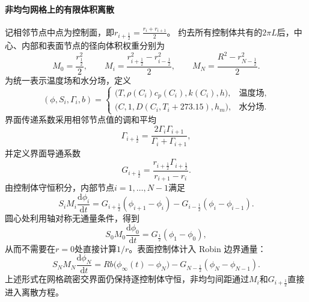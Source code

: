 \documentclass[withoutpreface,bwprint]{cumcmthesis}
\begin{document}
\paragraph{非均匀网格上的有限体积离散}
记相邻节点中点为控制面，即$r_{i+\frac12}=\frac{r_i+r_{i+1}}{2}$。
约去所有控制体共有的$2\pi L$后，中心、内部和表面节点的径向体积权重分别为
\begin{equation}
M_0=\frac{r_{\frac12}^2}{2},
\qquad
M_i=\frac{r_{i+\frac12}^2-r_{i-\frac12}^2}{2},
\qquad
M_N=\frac{R^2-r_{N-\frac12}^2}{2}.
\label{eq:q2-control-weights}
\end{equation}
为统一表示温度场和水分场，定义
\begin{equation}
(\phi,S_i,\Gamma_i,b)=
\begin{cases}
\bigl(T,\rho(C_i)c_p(C_i),k(C_i),h\bigr),
&\text{温度场},\\
\bigl(C,1,D(C_i,T_i+273.15),h_m\bigr),
&\text{水分场}.
\end{cases}
\label{eq:q2-unified-parameters}
\end{equation}
界面传递系数采用相邻节点值的调和平均
\begin{equation}
\Gamma_{i+\frac12}
=
\frac{2\Gamma_i\Gamma_{i+1}}{\Gamma_i+\Gamma_{i+1}},
\label{eq:q2-harmonic-coefficient}
\end{equation}
并定义界面导通系数
\begin{equation}
G_{i+\frac12}
=
\frac{r_{i+\frac12}\Gamma_{i+\frac12}}
{r_{i+1}-r_i}.
\label{eq:q2-face-conductance}
\end{equation}
由控制体守恒积分，内部节点$i=1,\ldots,N-1$满足
\begin{equation}
S_iM_i\frac{\mathrm d\phi_i}{\mathrm dt}
=
G_{i+\frac12}(\phi_{i+1}-\phi_i)
-G_{i-\frac12}(\phi_i-\phi_{i-1}).
\label{eq:q2-fvm-interior}
\end{equation}
圆心处利用轴对称无通量条件，得到
\begin{equation}
S_0M_0\frac{\mathrm d\phi_0}{\mathrm dt}
=
G_{\frac12}(\phi_1-\phi_0),
\label{eq:q2-fvm-center}
\end{equation}
从而不需要在$r=0$处直接计算$1/r$。表面控制体计入 Robin 边界通量：
\begin{equation}
S_NM_N\frac{\mathrm d\phi_N}{\mathrm dt}
=
Rb\bigl(\phi_\infty(t)-\phi_N\bigr)
-G_{N-\frac12}(\phi_N-\phi_{N-1}).
\label{eq:q2-fvm-surface}
\end{equation}
上述形式在网格疏密交界面仍保持逐控制体守恒，非均匀间距通过$M_i$和$G_{i+\frac12}$直接进入离散方程。
\end{document}
